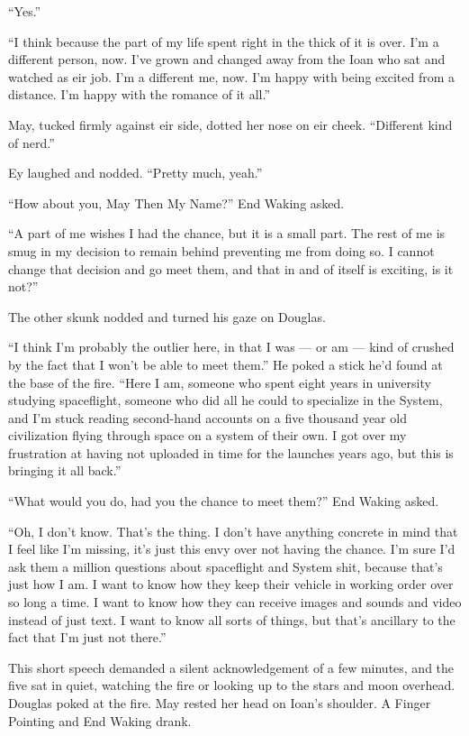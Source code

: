 ``Yes.''

``I think because the part of my life spent right in the thick of it is over. I'm a different person, now. I've grown and changed away from the Ioan who sat and watched as eir job. I'm a different me, now. I'm happy with being excited from a distance. I'm happy with the romance of it all.''

May, tucked firmly against eir side, dotted her nose on eir cheek. ``Different kind of nerd.''

Ey laughed and nodded. ``Pretty much, yeah.''

``How about you, May Then My Name?'' End Waking asked.

``A part of me wishes I had the chance, but it is a small part. The rest of me is smug in my decision to remain behind preventing me from doing so. I cannot change that decision and go meet them, and that in and of itself is exciting, is it not?''

The other skunk nodded and turned his gaze on Douglas.

``I think I'm probably the outlier here, in that I was — or am — kind of crushed by the fact that I won't be able to meet them.'' He poked a stick he'd found at the base of the fire. ``Here I am, someone who spent eight years in university studying spaceflight, someone who did all he could to specialize in the System, and I'm stuck reading second-hand accounts on a five thousand year old civilization flying through space on a system of their own. I got over my frustration at having not uploaded in time for the launches years ago, but this is bringing it all back.''

``What would you do, had you the chance to meet them?'' End Waking asked.

``Oh, I don't know. That's the thing. I don't have anything concrete in mind that I feel like I'm missing, it's just this envy over not having the chance. I'm sure I'd ask them a million questions about spaceflight and System shit, because that's just how I am. I want to know how they keep their vehicle in working order over so long a time. I want to know how they can receive images and sounds and video instead of just text. I want to know all sorts of things, but that's ancillary to the fact that I'm just not there.''

This short speech demanded a silent acknowledgement of a few minutes, and the five sat in quiet, watching the fire or looking up to the stars and moon overhead. Douglas poked at the fire. May rested her head on Ioan's shoulder. A Finger Pointing and End Waking drank.

